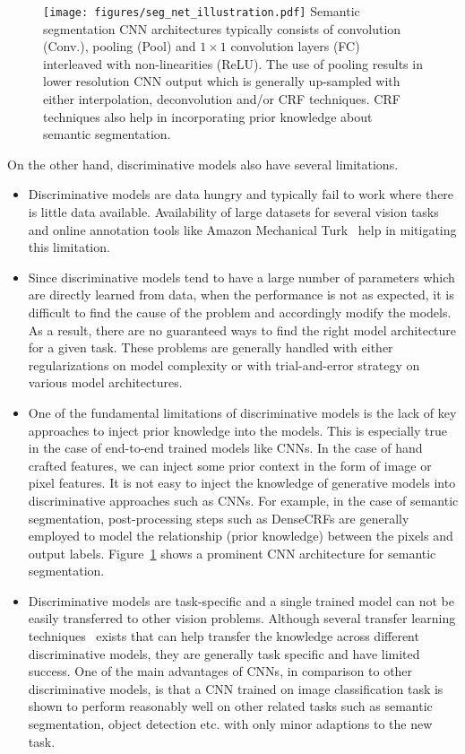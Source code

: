 \begin{figure}[t!]
 \centering
 \texttt{[image: figures/seg\_net\_illustration.pdf]}
 {Semantic segmentation CNN architectures typically consists of convolution (Conv.),
 pooling (Pool) and $1\times1$ convolution layers (FC) interleaved with non-linearities (ReLU).
 The use of pooling results in lower resolution CNN output which is generally up-sampled
 with either interpolation, deconvolution and/or CRF techniques. CRF techniques also help
 in incorporating prior knowledge about semantic segmentation.}
\label{fig:seg-net}
\end{figure}

On the other hand, discriminative models also have several limitations.

\begin{itemize}
\item Discriminative models are data hungry and typically fail to work where
there is little data available. Availability of large datasets for several vision
tasks and online annotation tools like Amazon Mechanical Turk~\cite{mturk} help
in mitigating this limitation.
\item Since discriminative models tend to have a large number of parameters
which are directly learned from data, when the performance is not as expected,
it is difficult to find the cause of the problem and accordingly modify the models.
As a result, there are no guaranteed ways
to find the right model architecture for a given task.
These problems are generally handled with either regularizations on model complexity
or with trial-and-error strategy on various model architectures.
\item One of the fundamental limitations of discriminative models is the lack of key
approaches to inject prior knowledge into the models. This is especially true
in the case of end-to-end trained models like CNNs. In the case of hand crafted
features, we can inject some prior context in the form of image or pixel features.
It is not easy to inject the knowledge of generative models into discriminative
approaches such as CNNs. For example, in the case of semantic segmentation,
post-processing steps such as DenseCRFs are generally employed to model the
relationship (prior knowledge) between the pixels and output labels.
Figure~\ref{fig:seg-net} shows a prominent CNN architecture for semantic segmentation.
\item Discriminative models are task-specific and a single trained model can not
be easily transferred to other vision problems.
Although several transfer learning techniques~\cite{pan2010survey} exists that
can help transfer the knowledge across different discriminative models,
they are generally task specific and have limited success.
One of the main advantages of CNNs, in comparison to other discriminative models,
is that a CNN trained on image classification task is shown to perform reasonably well on other related
tasks such as semantic segmentation, object detection etc. with only minor adaptions
to the new task.

\end{itemize}

